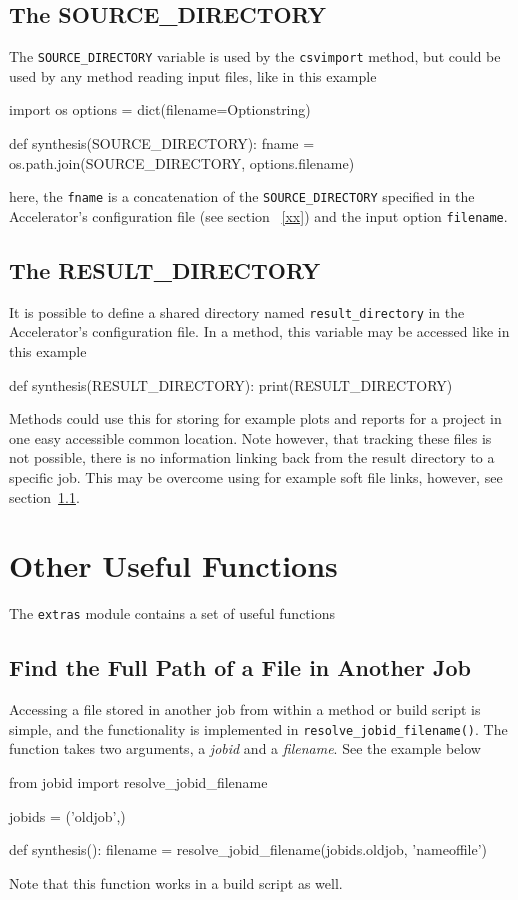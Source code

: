 \subsection{The SOURCE\_DIRECTORY}
The \texttt{SOURCE\_DIRECTORY} variable is used by
the \texttt{csvimport} method, but could be used by any method reading
input files, like in this example
\begin{python}
import os
options = dict(filename=Optionstring)

def synthesis(SOURCE_DIRECTORY):
    fname = os.path.join(SOURCE_DIRECTORY, options.filename)
\end{python}
here, the \texttt{fname} is a concatenation of
the \texttt{SOURCE\_DIRECTORY} specified in the Accelerator's
configuration file (see section ~\ref{xx}) and the input
option \texttt{filename}.


\subsection{The RESULT\_DIRECTORY}
It is possible to define a shared directory
named \texttt{result\_directory} in the Accelerator's configuration
file.  In a method, this variable may be accessed like in this example
\begin{python}
def synthesis(RESULT_DIRECTORY):
    print(RESULT_DIRECTORY)
\end{python}
Methods could use this for storing for example plots and reports for a
project in one easy accessible common location.  Note however, that
tracking these files is not possible, there is no information linking
back from the result directory to a specific job.  This may be
overcome using for example soft file links, however, see section~\ref{}.


\clearpage
\section{Other Useful Functions}
The \texttt{extras} module contains a set of useful functions


\subsection{Find the Full Path of a File in Another Job}
Accessing a file stored in another job from within a method or build
script is simple, and the functionality is implemented
in \texttt{resolve\_jobid\_filename()}.  The function takes two
arguments, a \textsl{jobid} and a \textsl{filename}.  See the example
below
\begin{python}
from jobid import resolve_jobid_filename

jobids = ('oldjob',)

def synthesis():
    filename = resolve_jobid_filename(jobids.oldjob, 'nameoffile')
\end{python}
Note that this function works in a build script as well.


